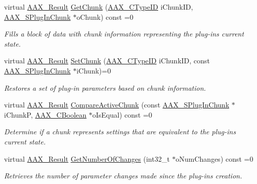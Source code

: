 \begin{Indent}
\begin{DoxyCompactItemize}
virtual \mbox{\hyperlink{a00392_a4d8f69a697df7f70c3a8e9b8ee130d2f}{A\+A\+X\+\_\+\+Result}} \mbox{\hyperlink{a01669_ab977041a440a9cd6f3e631c059ee8b99}{Get\+Chunk}} (\mbox{\hyperlink{a00392_ac678f9c1fbcc26315d209f71a147a175}{A\+A\+X\+\_\+\+C\+Type\+ID}} i\+Chunk\+ID, \mbox{\hyperlink{a01421}{A\+A\+X\+\_\+\+S\+Plug\+In\+Chunk}} $\ast$o\+Chunk) const =0
\begin{DoxyCompactList}\small\item\em Fills a block of data with chunk information representing the plug-\/in\textquotesingle{}s current state. \end{DoxyCompactList}\item 
virtual \mbox{\hyperlink{a00392_a4d8f69a697df7f70c3a8e9b8ee130d2f}{A\+A\+X\+\_\+\+Result}} \mbox{\hyperlink{a01669_a2d780ebc594683e24302871b809602e8}{Set\+Chunk}} (\mbox{\hyperlink{a00392_ac678f9c1fbcc26315d209f71a147a175}{A\+A\+X\+\_\+\+C\+Type\+ID}} i\+Chunk\+ID, const \mbox{\hyperlink{a01421}{A\+A\+X\+\_\+\+S\+Plug\+In\+Chunk}} $\ast$i\+Chunk)=0
\begin{DoxyCompactList}\small\item\em Restores a set of plug-\/in parameters based on chunk information. \end{DoxyCompactList}\item 
virtual \mbox{\hyperlink{a00392_a4d8f69a697df7f70c3a8e9b8ee130d2f}{A\+A\+X\+\_\+\+Result}} \mbox{\hyperlink{a01669_a1e86f849e970c9998313fc7d451ccf85}{Compare\+Active\+Chunk}} (const \mbox{\hyperlink{a01421}{A\+A\+X\+\_\+\+S\+Plug\+In\+Chunk}} $\ast$i\+ChunkP, \mbox{\hyperlink{a00392_aa216506530f1d19a2965931ced2b274b}{A\+A\+X\+\_\+\+C\+Boolean}} $\ast$o\+Is\+Equal) const =0
\begin{DoxyCompactList}\small\item\em Determine if a chunk represents settings that are equivalent to the plug-\/in\textquotesingle{}s current state. \end{DoxyCompactList}\item 
virtual \mbox{\hyperlink{a00392_a4d8f69a697df7f70c3a8e9b8ee130d2f}{A\+A\+X\+\_\+\+Result}} \mbox{\hyperlink{a01669_a17b96da201d9a242d3662e87525a7227}{Get\+Number\+Of\+Changes}} (int32\+\_\+t $\ast$o\+Num\+Changes) const =0
\begin{DoxyCompactList}\small\item\em Retrieves the number of parameter changes made since the plug-\/in\textquotesingle{}s creation. \end{DoxyCompactList}\end{DoxyCompactItemize}
\end{Indent}
